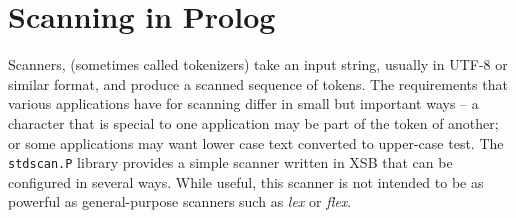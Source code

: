 \begin{description}
\end{description}

\section{Scanning in Prolog}

Scanners, (sometimes called tokenizers) take an input string, usually
in UTF-8 or similar format, and produce a scanned sequence of tokens.
The requirements that various applications have for scanning differ in
small but important ways -- a character that is special to one
application may be part of the token of another; or some applications
may want lower case text converted to upper-case test.  The {\tt
stdscan.P} library provides a simple scanner written in XSB that can
be configured in several ways.  While useful, this scanner is not
intended to be as powerful as general-purpose scanners such as {\em
lex} or {\em flex}.

